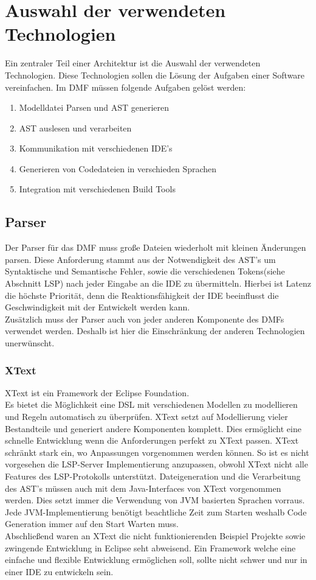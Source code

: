 \documentclass[./einleitung.tex]{subfiles}
\begin{document}
\section{Auswahl der verwendeten Technologien}
Ein zentraler Teil einer Architektur ist die Auswahl der verwendeten Technologien. Diese Technologien sollen die Lösung der Aufgaben einer Software vereinfachen.
\newline
Im DMF müssen folgende Aufgaben gelöst werden:
\begin{enumerate}
\item Modelldatei Parsen und AST generieren
\item AST auslesen und verarbeiten
\item Kommunikation mit verschiedenen IDE's
\item Generieren von Codedateien in verschieden Sprachen
\item Integration mit verschiedenen Build Tools
\end{enumerate}
\subsection{Parser}
Der Parser für das DMF muss große Dateien wiederholt mit kleinen Änderungen parsen. 
Diese Anforderung stammt aus der Notwendigkeit des AST's um Syntaktische und Semantische Fehler, sowie die verschiedenen Tokens(siehe Abschnitt LSP) nach jeder Eingabe an die IDE zu übermitteln. Hierbei ist Latenz die höchste Priorität, denn die Reaktionsfähigkeit der IDE beeinflusst die Geschwindigkeit mit der Entwickelt werden kann. \\
Zusätzlich muss der Parser auch von jeder anderen Komponente des DMFs verwendet werden. Deshalb ist hier die Einschränkung der anderen Technologien unerwünscht.
\subsubsection{XText}
XText ist ein Framework der Eclipse Foundation.\\
Es bietet die Möglichkeit eine DSL mit verschiedenen Modellen zu modellieren und Regeln automatisch zu überprüfen.
XText setzt auf Modellierung vieler Bestandteile und generiert andere Komponenten komplett. Dies ermöglicht eine schnelle Entwicklung wenn die Anforderungen perfekt zu XText passen. XText schränkt stark ein, wo Anpassungen vorgenommen werden können. So ist es nicht vorgesehen die LSP-Server Implementierung anzupassen, obwohl XText nicht alle Features des LSP-Protokolls unterstützt. Dateigeneration und die Verarbeitung des AST's müssen auch mit dem Java-Interfaces von XText vorgenommen werden. Dies setzt immer die Verwendung von JVM basierten Sprachen vorraus. Jede JVM-Implementierung benötigt beachtliche Zeit zum Starten weshalb Code Generation immer auf den Start Warten muss. \\
Abschließend waren an XText die nicht funktionierenden Beispiel Projekte sowie zwingende Entwicklung in Eclipse seht abweisend. Ein Framework welche eine einfache und flexible Entwicklung ermöglichen soll, sollte nicht schwer und nur in einer IDE zu entwickeln sein.
\end{document}
